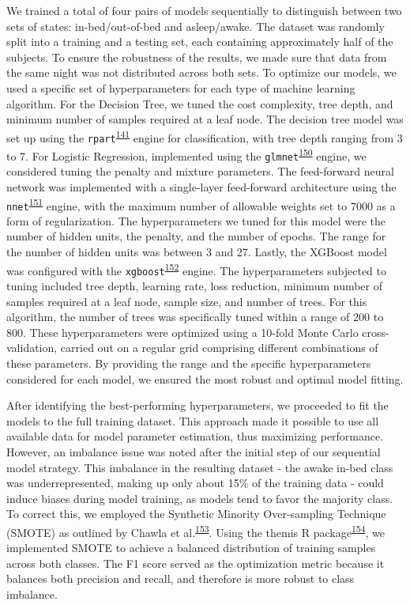 \documentclass[
  10pt,
]{scrbook}
\begin{document}
We trained a total of four pairs of models sequentially to distinguish
between two sets of states: in-bed/out-of-bed and asleep/awake. The
dataset was randomly split into a training and a testing set, each
containing approximately half of the subjects. To ensure the robustness
of the results, we made sure that data from the same night was not
distributed across both sets. To optimize our models, we used a specific
set of hyperparameters for each type of machine learning algorithm. For
the Decision Tree, we tuned the cost complexity, tree depth, and minimum
number of samples required at a leaf node. The decision tree model was
set up using the
\texttt{rpart}\textsuperscript{\protect\hyperlink{ref-rpart}{141}}
engine for classification, with tree depth ranging from 3 to 7. For
Logistic Regression, implemented using the
\texttt{glmnet}\textsuperscript{\protect\hyperlink{ref-friedman_glmnet_2010}{150}}
engine, we considered tuning the penalty and mixture parameters. The
feed-forward neural network was implemented with a single-layer
feed-forward architecture using the
\texttt{nnet}\textsuperscript{\protect\hyperlink{ref-nnet}{151}} engine,
with the maximum number of allowable weights set to 7000 as a form of
regularization. The hyperparameters we tuned for this model were the
number of hidden units, the penalty, and the number of epochs. The range
for the number of hidden units was between 3 and 27. Lastly, the XGBoost
model was configured with the
\texttt{xgboost}\textsuperscript{\protect\hyperlink{ref-xgboost}{152}}
engine. The hyperparameters subjected to tuning included tree depth,
learning rate, loss reduction, minimum number of samples required at a
leaf node, sample size, and number of trees. For this algorithm, the
number of trees was specifically tuned within a range of 200 to 800.
These hyperparameters were optimized using a 10-fold Monte Carlo
cross-validation, carried out on a regular grid comprising different
combinations of these parameters. By providing the range and the
specific hyperparameters considered for each model, we ensured the most
robust and optimal model fitting.

After identifying the best-performing hyperparameters, we proceeded to
fit the models to the full training dataset. This approach made it
possible to use all available data for model parameter estimation, thus
maximizing performance. However, an imbalance issue was noted after the
initial step of our sequential model strategy. This imbalance in the
resulting dataset - the awake in-bed class was underrepresented, making
up only about 15\% of the training data - could induce biases during
model training, as models tend to favor the majority class. To correct
this, we employed the Synthetic Minority Over-sampling Technique (SMOTE)
as outlined by Chawla et
al.\textsuperscript{\protect\hyperlink{ref-chawla_smote_2002}{153}}.
Using the themis R
package\textsuperscript{\protect\hyperlink{ref-themis}{154}}, we
implemented SMOTE to achieve a balanced distribution of training samples
across both classes. The F1 score served as the optimization metric
because it balances both precision and recall, and therefore is more
robust to class imbalance.
\end{document}
